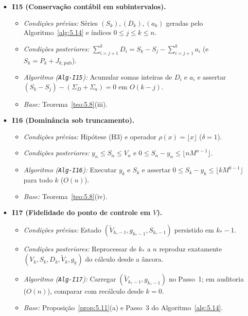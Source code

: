 \documentclass[11pt, a4paper]{article}
\theoremstyle{definition}
\theoremstyle{plain}
\theoremstyle{remark}
\begin{document}
\begin{itemize}
    \item \textbf{I15 (Conservação contábil em subintervalos).}
    \begin{itemize}
        \item \emph{Condições prévias:} Séries $(S_k), (D_k), (a_k)$ geradas pelo Algoritmo~\ref{alg:5.14} e índices $0 \le j \le k \le n$.
        \item \emph{Condições posteriores:} $\sum_{i=j+1}^k D_i = S_k - S_j - \sum_{i=j+1}^k a_i$ (e $S_k = P_k + J_{k,\text{pub}}$).
        \item \emph{Algoritmo (\texttt{Alg-I15}):} Acumular somas inteiras de $D_i$ e $a_i$ e assertar $(S_k - S_j) - (\Sigma_D + \Sigma_a) = 0$ em $O(k - j)$.
        \item \emph{Base:} Teorema~\ref{teo:5.8}(iii).
    \end{itemize}

    \item \textbf{I16 (Dominância sob truncamento).}
    \begin{itemize}
        \item \emph{Condições prévias:} Hipótese (H3) e operador $\rho(x) = \lfloor x \rfloor$ ($\delta = 1$).
        \item \emph{Condições posteriores:} $y_n \le S_n \le V_n$ e $0 \le S_n - y_n \le \lfloor n M^{n-1} \rfloor$.
        \item \emph{Algoritmo (\texttt{Alg-I16}):} Executar $y_k$ e $S_k$ e assertar $0 \le S_k - y_k \le \lfloor k M^{k-1} \rfloor$ para todo $k$ ($O(n)$).
        \item \emph{Base:} Teorema~\ref{teo:5.8}(iv).
    \end{itemize}

    \item \textbf{I17 (Fidelidade do ponto de controle em $V$).}
    \begin{itemize}
        \item \emph{Condições prévias:} Estado $(\tilde{V}_{k_* - 1}, g_{k_* - 1}, S_{k_* - 1})$ persistido em $k_* - 1$.
        \item \emph{Condições posteriores:} Reprocessar de $k_*$ a $n$ reproduz exatamente $(V_k, S_k, D_k, \tilde{V}_k, g_k)$ do cálculo desde a âncora.
        \item \emph{Algoritmo (\texttt{Alg-I17}):} Carregar $(\tilde{V}_{k_* - 1}, g_{k_* - 1})$ no Passo~1; em auditoria ($O(n)$), comparar com recálculo desde $k=0$.
        \item \emph{Base:} Proposição~\ref{prop:5.11}(a) e Passo~3 do Algoritmo~\ref{alg:5.14}.
    \end{itemize}


\end{itemize}
\end{document}
